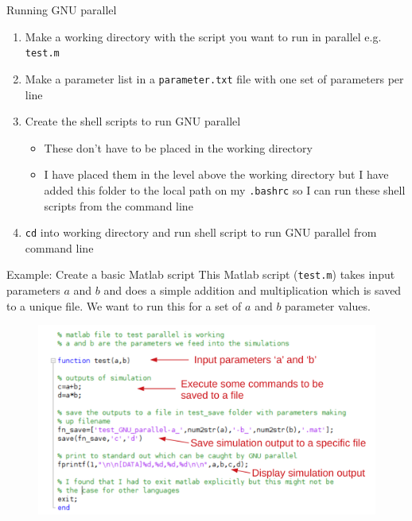\documentclass{beamer}
\begin{document}
\begin{frame}{Running GNU parallel}
\begin{enumerate}
\item Make a working directory with the script you want to run in parallel e.g. \texttt{test.m}
\item Make a parameter list in a \texttt{parameter.txt} file with one set of parameters per line
\item Create the shell scripts to run GNU parallel
\begin{itemize}
\item These don't have to be placed in the working directory
\item I have placed them in the level above the working directory but I have added this folder to the local path on my \texttt{.bashrc} so I can run these shell scripts from the command line
\end{itemize}
\item \texttt{cd} into working directory and run shell script to run GNU parallel from command line
\end{enumerate}
\end{frame}

\begin{frame}{Example: Create a basic Matlab script}
This Matlab script (\texttt{test.m}) takes input parameters $a$ and $b$ and does a simple addition and multiplication which is saved to a unique file. We want to run this for a set of $a$ and $b$ parameter values.
\begin{figure}
\includegraphics[width=.8\linewidth]{figures/matlab_code_annotated.pdf}	
\end{figure}
\end{frame}
\end{document}
